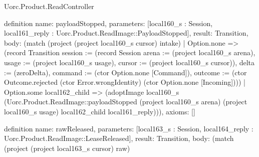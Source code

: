 \begin{lexlean}{Uorc.Product.ReadController}
\begin{semanticmodule}
definition{
  name: payloadStopped,
  parameters: [local160_s : Session, local161_reply : Uorc.Product.ReadImage::PayloadStopped],
  result: Transition,
  body: (match (project (project local160_s cursor) intake)
    | Option.none => (record Transition {session := (record Session {arena := (project local160_s arena), usage := (project local160_s usage), cursor := (project local160_s cursor)}), delta := (zeroDelta), command := (ctor Option.none [Command]), outcome := (ctor Outcome.rejected (ctor Error.wrongIdentity) (ctor Option.none [Incoming]))})
    | Option.some local162_child => (adoptImage local160_s (Uorc.Product.ReadImage::payloadStopped (project local160_s arena) (project local160_s usage) local162_child local161_reply))),
  axioms: []
}

definition{
  name: rawReleased,
  parameters: [local163_s : Session, local164_reply : Uorc.Product.ReadImage::LeaseReleased],
  result: Transition,
  body: (match (project (project local163_s cursor) raw)
}
\end{semanticmodule}
\end{lexlean}
